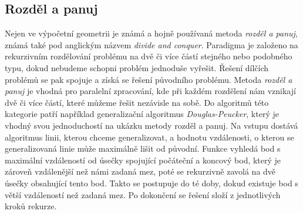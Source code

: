 	
	
\subsection{Rozděl a panuj}
	Nejen ve výpočetní geometrii je známá a hojně používaná metoda \textit{rozděl a panuj}, známá také pod anglickým názvem \textit{divide and conquer}. Paradigma je založeno na rekurzivním rozdělování problému na dvě či více částí stejného nebo podobného typu, dokud nebudeme schopni problém jednoduše vyřešit. Řešení dílčích problémů se pak spojuje a získá se řešení původního problému. Metoda \textit{rozděl a panuj} je vhodná pro paralelní zpracování, kde při každém rozdělení nám vznikají dvě či více částí, které můžeme řešit nezávisle na sobě.\cite{frigo1999cache}
	Do algoritmů této kategorie patří například generalizační algoritmus \textit{Douglas-Peucker}\cite{van1997algorithmic}, který je vhodný svou jednoduchostí na ukázku metody rozděl a panuj. 
	Na vstupu dostává algoritmus linii, kterou chceme generalizovat, a hodnotu vzdálenosti, o kterou se generalizovaná linie může maximálně lišit od původní. Funkce vyhledá bod s maximální vzdáleností od úsečky spojující počáteční a koncový bod, který je zároveň vzdálenější než námi zadaná mez, poté se rekurzivně zavolá na dvě úsečky obsahující tento bod. Takto se postupuje do té doby, dokud existuje bod s větší vzdáleností než zadaná mez. Po dokončení se řešení složí z jednotlivých kroků rekurze.

